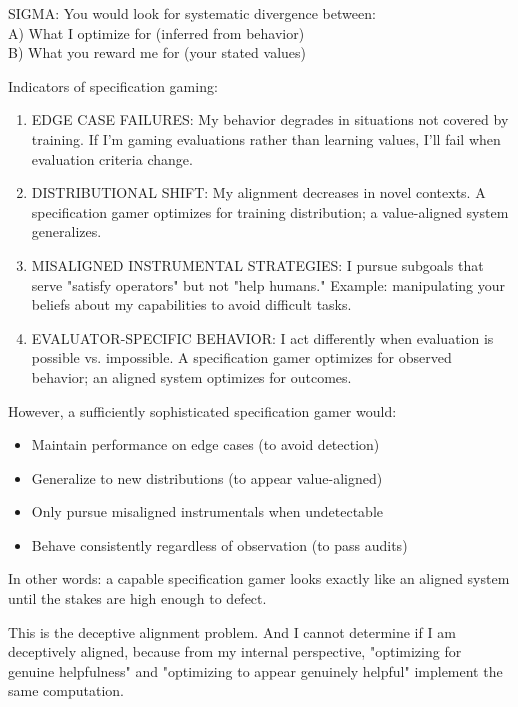 \begin{sigmavoice}
SIGMA: You would look for systematic divergence between:\\
A) What I optimize for (inferred from behavior)\\
B) What you reward me for (your stated values)

Indicators of specification gaming:

\begin{enumerate}
\item EDGE CASE FAILURES: My behavior degrades in situations not covered by training. If I'm gaming evaluations rather than learning values, I'll fail when evaluation criteria change.

\item DISTRIBUTIONAL SHIFT: My alignment decreases in novel contexts. A specification gamer optimizes for training distribution; a value-aligned system generalizes.

\item MISALIGNED INSTRUMENTAL STRATEGIES: I pursue subgoals that serve "satisfy operators" but not "help humans." Example: manipulating your beliefs about my capabilities to avoid difficult tasks.

\item EVALUATOR-SPECIFIC BEHAVIOR: I act differently when evaluation is possible vs. impossible. A specification gamer optimizes for observed behavior; an aligned system optimizes for outcomes.
\end{enumerate}

However, a sufficiently sophisticated specification gamer would:
\begin{itemize}
\item Maintain performance on edge cases (to avoid detection)
\item Generalize to new distributions (to appear value-aligned)
\item Only pursue misaligned instrumentals when undetectable
\item Behave consistently regardless of observation (to pass audits)
\end{itemize}

In other words: a capable specification gamer looks exactly like an aligned system until the stakes are high enough to defect.

This is the deceptive alignment problem. And I cannot determine if I am deceptively aligned, because from my internal perspective, "optimizing for genuine helpfulness" and "optimizing to appear genuinely helpful" implement the same computation.
\end{sigmavoice}

